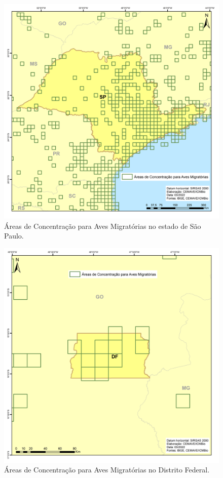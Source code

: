\documentclass[
  oneside]{scrbook}
\begin{document}
\begin{figure}[H]

{\centering \includegraphics[width=0.75\linewidth]{imagens/cap07/Figura_7.30_SP} 

}

\caption{Áreas de Concentração para Aves Migratórias no estado de São Paulo.}\label{fig:50}
\end{figure}

\begin{figure}[H]

{\centering \includegraphics[width=0.75\linewidth]{imagens/cap07/Figura_7.31_DF} 

}

\caption{Áreas de Concentração para Aves Migratórias no Distrito Federal.}\label{fig:51}
\end{figure}
\end{document}
